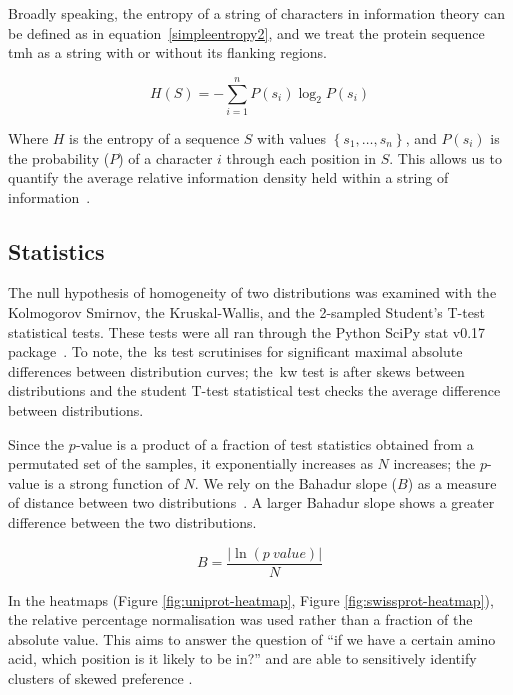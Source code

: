 Broadly speaking, the entropy of a string of characters in information theory can be defined as in equation~\ref{simpleentropy2}, and we treat the protein sequence \gls{tmh} as a string with or without its flanking regions.

\begin{equation} \label{simpleentropy2}
H \left( S \right)=-\sum _{ i=1 }^{ n }{ { P }\left({ s }_{ i }\right)\log _{ 2 }{ P } \left({ s }_{ i } \right)}
\end{equation}

Where $H$ is the entropy of a sequence $S$ with values $ \left\{ {s}_{1},\ldots, {s}_{n} \right\} $, and $P \left( s_i \right)$ is the probability ($P$) of a character $i$ through each position in $S$.
This allows us to quantify the average relative information density held within a string of information~\cite{Shannon1948}.

\subsection{Statistics}

The null hypothesis of homogeneity of two distributions was examined with the Kolmogorov Smirnov, the Kruskal-Wallis, and the 2-sampled Student's T-test statistical tests.
These tests were all ran through the Python SciPy stat v0.17 package~\cite{VanderWalt2011}.
To note, the~\gls{ks} test scrutinises for significant maximal absolute differences between distribution curves; the~\gls{kw} test is after skews between distributions and the student T-test statistical test checks the average difference between distributions.

Since the $p$\-‑value is a product of a fraction of test statistics obtained from a permutated set of the samples, it exponentially increases as $N$ increases; the $p$\--value is a strong function of $N$.
We rely on the Bahadur slope ($B$) as a measure of distance between two distributions~\cite{Bahadur1967, Bahadur1971, Sunyaev1998, Baker2017}. A larger Bahadur slope shows a greater difference between the two distributions.

\begin{equation} \label{eq:bahadur2}
B=\frac{|\ln(p~value)|}{N}
\end{equation}

In the heatmaps (Figure \ref{fig:uniprot-heatmap}, Figure \ref{fig:swissprot-heatmap}), the relative percentage normalisation was used rather than a fraction of the absolute value.
This aims to answer the question of ``if we have a certain amino acid, which position is it likely to be in?'' and are able to sensitively identify clusters of skewed preference \cite{Baker2017}.

